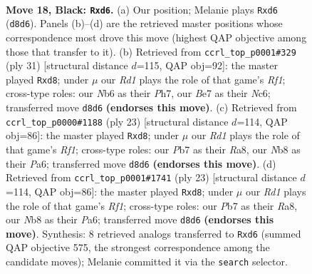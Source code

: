 \documentclass[11pt]{article}
\begin{document}
\begin{figure}[p]
\label{fig:thought-m33}
\end{figure}

\clearpage

\begin{figure}[p]\centering
\begin{subfigure}{0.46\textwidth}\centering
\resizebox{\linewidth}{!}{%
\newchessgame
\chessboard[
  setfen={rnbr2k1/1p2bpp1/pn1Qp3/7p/8/1Pp1p1P1/P3PPBP/RNB1RK2 b - - 0 18},
  showmover=false,
  pgfstyle=straightmove, color=movearrow, markmove={d8-d6}
]}
\caption{}
\end{subfigure}\hfill
\begin{subfigure}{0.46\textwidth}\centering
\resizebox{\linewidth}{!}{%
\newchessgame
\chessboard[
  setfen={r1bQ1rk1/4bppp/p1n1p3/1pp3P1/4PP2/P1N1B3/1PP4P/2KR1B1R b - - 0 16},
  showmover=false,
  pgfstyle=straightmove, color=movearrow, markmove={f8-d8}
]}
\caption{}
\end{subfigure}
\\[4pt]
\begin{subfigure}{0.46\textwidth}\centering
\resizebox{\linewidth}{!}{%
\newchessgame
\chessboard[
  setfen={r1bQ1rk1/2p1bppp/p4n2/4p3/Pp2P3/1B6/1PP2PPP/RNB1R1K1 b - - 0 12},
  showmover=false,
  pgfstyle=straightmove, color=movearrow, markmove={f8-d8}
]}
\caption{}
\end{subfigure}\hfill
\begin{subfigure}{0.46\textwidth}\centering
\resizebox{\linewidth}{!}{%
\newchessgame
\chessboard[
  setfen={r1bQ1rk1/2p1bppp/p4n2/4p3/Pp2P3/1B6/1PP2PPP/RNB1R1K1 b - - 0 12},
  showmover=false,
  pgfstyle=straightmove, color=movearrow, markmove={f8-d8}
]}
\caption{}
\end{subfigure}
\caption{\textbf{Move 18, Black: \texttt{Rxd6}.} (a) Our position; Melanie plays \texttt{Rxd6} (\texttt{d8d6}). Panels (b)--(d) are the retrieved master positions whose correspondence most drove this move (highest QAP objective among those that transfer to it). (b) Retrieved from \texttt{ccrl\_top\_p0001\#329} (ply 31) [structural distance $d$=115, QAP obj=92]: the master played \texttt{Rxd8}; under $\mu$ our \emph{Rd1} plays the role of that game's \emph{Rf1}; cross-type roles: our \emph{N}b6 as their \emph{P}h7, our \emph{B}e7 as their \emph{N}c6; transferred move \texttt{d8d6} \textbf{(endorses this move)}. (c) Retrieved from \texttt{ccrl\_top\_p0000\#1188} (ply 23) [structural distance $d$=114, QAP obj=86]: the master played \texttt{Rxd8}; under $\mu$ our \emph{Rd1} plays the role of that game's \emph{Rf1}; cross-type roles: our \emph{P}b7 as their \emph{R}a8, our \emph{N}b8 as their \emph{P}a6; transferred move \texttt{d8d6} \textbf{(endorses this move)}. (d) Retrieved from \texttt{ccrl\_top\_p0001\#1741} (ply 23) [structural distance $d$=114, QAP obj=86]: the master played \texttt{Rxd8}; under $\mu$ our \emph{Rd1} plays the role of that game's \emph{Rf1}; cross-type roles: our \emph{P}b7 as their \emph{R}a8, our \emph{N}b8 as their \emph{P}a6; transferred move \texttt{d8d6} \textbf{(endorses this move)}. Synthesis: 8 retrieved analogs transferred to \texttt{Rxd6} (summed QAP objective 575, the strongest correspondence among the candidate moves); Melanie committed it via the \texttt{search} selector.}

\end{figure}
\end{document}
